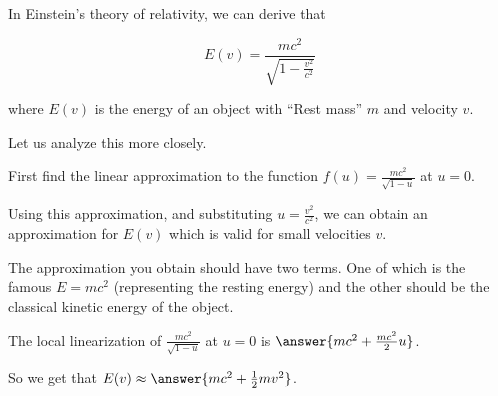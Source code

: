 \documentclass{ximera}
\author{Steven Gubkin}
\begin{document}
\begin{exercise}
In Einstein's theory of relativity, we can derive that

$$E(v) = \frac{mc^2}{\sqrt{1-\frac{v^2}{c^2}}}$$

where $E(v)$ is the energy of an object with ``Rest mass'' $m$ and velocity $v$.

Let us analyze this more closely.

First find the linear approximation to the function $f(u) = \frac{mc^2}{\sqrt{1-u}}$ at $u=0$.

Using this approximation, and substituting $u = \frac{v^2}{c^2}$, we can obtain an approximation for $E(v)$ which is valid for small velocities $v$.

The approximation you obtain should have two terms.  One of which is the famous $E = mc^2$ (representing the resting energy) and the other should be the classical kinetic energy of the object.

\begin{prompt}
	The local linearization of $\frac{m c^2}{\sqrt{1-u}}$ at $u=0$ is $\answer{m c^2 +\frac{m c^2}{2}u}$.

	So we get that $E(v) \approx \answer{mc^2+\frac{1}{2}mv^2}$.
\end{prompt}

\end{exercise}
\end{document}
